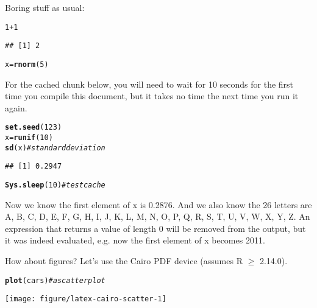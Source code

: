 \documentclass{article}\usepackage[]{graphicx}\usepackage[]{xcolor}
\makeatletter
\newcommand{\hlnum}[1]{\textcolor[rgb]{0.686,0.059,0.569}{#1}}%
\newcommand{\hlcom}[1]{\textcolor[rgb]{0.678,0.584,0.686}{\textit{#1}}}%
\newcommand{\hlopt}[1]{\textcolor[rgb]{0,0,0}{#1}}%
\newcommand{\hldef}[1]{\textcolor[rgb]{0.345,0.345,0.345}{#1}}%
\newcommand{\hlkwb}[1]{\textcolor[rgb]{0.69,0.353,0.396}{#1}}%
\newcommand{\hlkwd}[1]{\textcolor[rgb]{0.737,0.353,0.396}{\textbf{#1}}}%
\newenvironment{kframe}{%
 \def\at@end@of@kframe{}%
 \ifinner\ifhmode%
  \def\at@end@of@kframe{\end{minipage}}%
  \begin{minipage}{\columnwidth}%
 \fi\fi%
 \def\FrameCommand##1{\hskip\@totalleftmargin \hskip-\fboxsep
 \colorbox{shadecolor}{##1}\hskip-\fboxsep
     \hskip-\linewidth \hskip-\@totalleftmargin \hskip\columnwidth}%
 \MakeFramed {\advance\hsize-\width
   \@totalleftmargin\z@ \linewidth\hsize
   \@setminipage}}%
 {\par\unskip\endMakeFramed%
 \at@end@of@kframe}
\newenvironment{knitrout}{}{} %
\makeatother
\begin{document}
Boring stuff as usual:

\begin{knitrout}
\color{fgcolor}\begin{kframe}
\begin{alltt}
\hlnum{1} \hlopt{+} \hlnum{1}
\end{alltt}
\begin{verbatim}
## [1] 2
\end{verbatim}
\begin{alltt}
\hldef{x} \hlkwb{=} \hlkwd{rnorm}\hldef{(}\hlnum{5}\hldef{)}
\end{alltt}
\end{kframe}
\end{knitrout}

For the cached chunk below, you will need to wait for 10 seconds for
the first time you compile this document, but it takes no time the
next time you run it again.

\begin{knitrout}
\color{fgcolor}\begin{kframe}
\begin{alltt}
\hlkwd{set.seed}\hldef{(}\hlnum{123}\hldef{)}
\hldef{x} \hlkwb{=} \hlkwd{runif}\hldef{(}\hlnum{10}\hldef{)}
\hlkwd{sd}\hldef{(x)}  \hlcom{# standard deviation}
\end{alltt}
\begin{verbatim}
## [1] 0.2947
\end{verbatim}
\begin{alltt}
\hlkwd{Sys.sleep}\hldef{(}\hlnum{10}\hldef{)}  \hlcom{# test cache}
\end{alltt}
\end{kframe}
\end{knitrout}

Now we know the first element of x is 0.2876. And we also know
the 26 letters are A, B, C, D, E, F, G, H, I, J, K, L, M, N, O, P, Q, R, S, T, U, V, W, X, Y, Z. An expression that returns a
value of length 0 will be removed from the output,  but it was indeed evaluated, e.g. now the first element
of x becomes 2011.

How about figures? Let's use the Cairo PDF device (assumes R $\geq$
2.14.0).

\begin{knitrout}
\color{fgcolor}\begin{kframe}
\begin{alltt}
\hlkwd{plot}\hldef{(cars)}  \hlcom{# a scatter plot}
\end{alltt}
\end{kframe}
\texttt{[image: figure/latex-cairo-scatter-1]} 
\end{knitrout}
\end{document}
